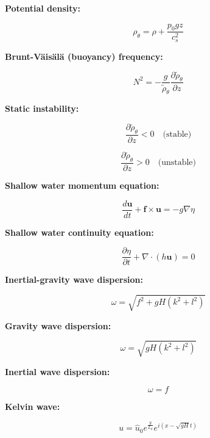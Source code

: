 \documentclass[12pt]{article}
\numberwithin{equation}{section}
\numberwithin{figure}{section}
\numberwithin{table}{section}
\begin{document}
\textbf{Potential density:}

\begin{equation}
  \rho_\theta = \rho + \frac{p_0 g z}{c_s^2}
\end{equation}

\textbf{Brunt-Väisälä (buoyancy) frequency:}

\begin{equation}
  N^2 = - \frac{g}{\widetilde{\rho}_\theta} \frac{\partial \widetilde{\rho}_\theta}{\partial z}
\end{equation}

\textbf{Static instability:}

\begin{equation}
  \frac{\partial \widetilde{\rho}_\theta}{\partial z} < 0 \quad \text{(stable)}
\end{equation}

\begin{equation}
  \frac{\partial \widetilde{\rho}_\theta}{\partial z} > 0 \quad \text{(unstable)}
\end{equation}

\textbf{Shallow water momentum equation:}

\begin{equation}
  \frac{d \mathbf{u}}{dt} + \mathbf{f} \times \mathbf{u} = - g \nabla \eta
\end{equation}

\textbf{Shallow water continuity equation:}

\begin{equation}
  \frac{\partial \eta}{\partial t} + \nabla \cdot (h \mathbf{u}) = 0
\end{equation}

\textbf{Inertial-gravity wave dispersion:}

\begin{equation}
  \omega = \sqrt{f^2 + gH(k^2 + l^2)}
\end{equation}

\textbf{Gravity wave dispersion:}

\begin{equation}
  \omega = \sqrt{gH(k^2 + l^2)}
\end{equation}

\textbf{Inertial wave dispersion:}

\begin{equation}
  \omega = f
\end{equation}

\textbf{Kelvin wave:}

\begin{equation}
  u = \widehat{u}_0 e^{\frac{y}{L_d}} e^{i(x - \sqrt{gH} t)}
\end{equation}
\end{document}
